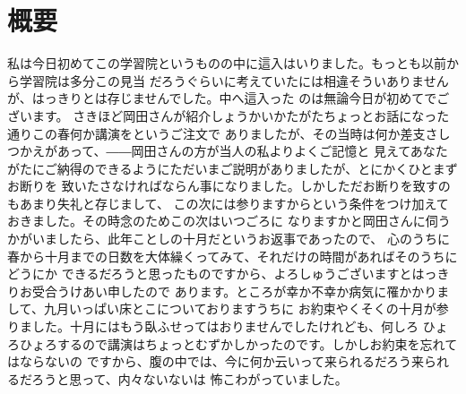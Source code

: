 \chapter{概要}
  私は今日初めてこの学習院というものの中に這入はいりました。もっとも以前から学習院は多分この見当
  だろうぐらいに考えていたには相違そういありませんが、はっきりとは存じませんでした。中へ這入った
  のは無論今日が初めてでございます。
  さきほど岡田さんが紹介しょうかいかたがたちょっとお話になった通りこの春何か講演をというご注文で
  ありましたが、その当時は何か差支さしつかえがあって、――岡田さんの方が当人の私よりよくご記憶と
  見えてあなたがたにご納得のできるようにただいまご説明がありましたが、とにかくひとまずお断りを
  致いたさなければならん事になりました。しかしただお断りを致すのもあまり失礼と存じまして、
  この次には参りますからという条件をつけ加えておきました。その時念のためこの次はいつごろに
  なりますかと岡田さんに伺うかがいましたら、此年ことしの十月だというお返事であったので、
  心のうちに春から十月までの日数を大体繰くってみて、それだけの時間があればそのうちにどうにか
  できるだろうと思ったものですから、よろしゅうございますとはっきりお受合うけあい申したので
  あります。ところが幸か不幸か病気に罹かかりまして、九月いっぱい床とこについておりますうちに
  お約束やくそくの十月が参りました。十月にはもう臥ふせってはおりませんでしたけれども、何しろ
  ひょろひょろするので講演はちょっとむずかしかったのです。しかしお約束を忘れてはならないの
  ですから、腹の中では、今に何か云いって来られるだろう来られるだろうと思って、内々ないないは
  怖こわがっていました。
